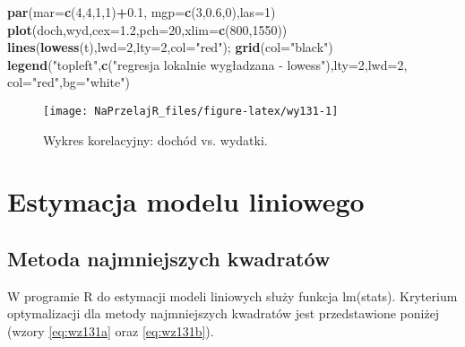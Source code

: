 \documentclass[polish,]{book}
\newenvironment{Shaded}{\begin{snugshade}}{\end{snugshade}}
\newcommand{\DataTypeTok}[1]{\textcolor[rgb]{0.13,0.29,0.53}{#1}}
\newcommand{\DecValTok}[1]{\textcolor[rgb]{0.00,0.00,0.81}{#1}}
\newcommand{\FloatTok}[1]{\textcolor[rgb]{0.00,0.00,0.81}{#1}}
\newcommand{\KeywordTok}[1]{\textcolor[rgb]{0.13,0.29,0.53}{\textbf{#1}}}
\newcommand{\NormalTok}[1]{#1}
\newcommand{\OperatorTok}[1]{\textcolor[rgb]{0.81,0.36,0.00}{\textbf{#1}}}
\newcommand{\StringTok}[1]{\textcolor[rgb]{0.31,0.60,0.02}{#1}}
\begin{document}
\begin{Shaded}
\begin{Highlighting}[]
\KeywordTok{par}\NormalTok{(}\DataTypeTok{mar=}\KeywordTok{c}\NormalTok{(}\DecValTok{4}\NormalTok{,}\DecValTok{4}\NormalTok{,}\DecValTok{1}\NormalTok{,}\DecValTok{1}\NormalTok{)}\OperatorTok{+}\FloatTok{0.1}\NormalTok{, }\DataTypeTok{mgp=}\KeywordTok{c}\NormalTok{(}\DecValTok{3}\NormalTok{,}\FloatTok{0.6}\NormalTok{,}\DecValTok{0}\NormalTok{),}\DataTypeTok{las=}\DecValTok{1}\NormalTok{)}
\KeywordTok{plot}\NormalTok{(doch,wyd,}\DataTypeTok{cex=}\FloatTok{1.2}\NormalTok{,}\DataTypeTok{pch=}\DecValTok{20}\NormalTok{,}\DataTypeTok{xlim=}\KeywordTok{c}\NormalTok{(}\DecValTok{800}\NormalTok{,}\DecValTok{1550}\NormalTok{))}
\KeywordTok{lines}\NormalTok{(}\KeywordTok{lowess}\NormalTok{(t),}\DataTypeTok{lwd=}\DecValTok{2}\NormalTok{,}\DataTypeTok{lty=}\DecValTok{2}\NormalTok{,}\DataTypeTok{col=}\StringTok{"red"}\NormalTok{); }\KeywordTok{grid}\NormalTok{(}\DataTypeTok{col=}\StringTok{"black"}\NormalTok{)}
\KeywordTok{legend}\NormalTok{(}\StringTok{"topleft"}\NormalTok{,}\KeywordTok{c}\NormalTok{(}\StringTok{"regresja lokalnie wygładzana - lowess"}\NormalTok{),}\DataTypeTok{lty=}\DecValTok{2}\NormalTok{,}\DataTypeTok{lwd=}\DecValTok{2}\NormalTok{, }\DataTypeTok{col=}\StringTok{"red"}\NormalTok{,}\DataTypeTok{bg=}\StringTok{"white"}\NormalTok{)}
\end{Highlighting}
\end{Shaded}

\begin{figure}[h]

{\centering \texttt{[image: NaPrzelajR\_files/figure-latex/wy131-1]} 

}

\caption{Wykres korelacyjny: dochód vs. wydatki.}\label{fig:wy131}
\end{figure}

\hypertarget{part_13.2}{%
\section{Estymacja modelu liniowego}\label{part_13.2}}

\hypertarget{part_13.2.1}{%
\subsection{Metoda najmniejszych kwadratów}\label{part_13.2.1}}

W programie R do estymacji modeli liniowych służy funkcja lm(stats). Kryterium
optymalizacji dla metody najmniejszych kwadratów jest przedstawione poniżej (wzory \eqref{eq:wz131a} oraz \eqref{eq:wz131b}).
\end{document}
